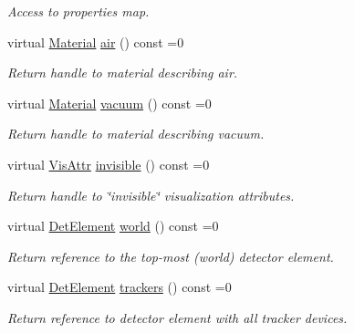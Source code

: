\begin{DoxyCompactItemize}
\begin{DoxyCompactList}\small\item\em Access to properties map. \item\end{DoxyCompactList}\item 
virtual \hyperlink{class_d_d4hep_1_1_geometry_1_1_material}{Material} \hyperlink{class_d_d4hep_1_1_geometry_1_1_l_c_d_d_a35239d8469cba6c091e970a1baec312b}{air} () const =0
\begin{DoxyCompactList}\small\item\em Return handle to material describing air. \item\end{DoxyCompactList}\item 
virtual \hyperlink{class_d_d4hep_1_1_geometry_1_1_material}{Material} \hyperlink{class_d_d4hep_1_1_geometry_1_1_l_c_d_d_adf89eaa970c7c23b6896f79a6ad28b7f}{vacuum} () const =0
\begin{DoxyCompactList}\small\item\em Return handle to material describing vacuum. \item\end{DoxyCompactList}\item 
virtual \hyperlink{class_d_d4hep_1_1_geometry_1_1_vis_attr}{VisAttr} \hyperlink{class_d_d4hep_1_1_geometry_1_1_l_c_d_d_acafee280cadae2b44117eb751e0790aa}{invisible} () const =0
\begin{DoxyCompactList}\small\item\em Return handle to \char`\"{}invisible\char`\"{} visualization attributes. \item\end{DoxyCompactList}\item 
virtual \hyperlink{class_d_d4hep_1_1_geometry_1_1_det_element}{DetElement} \hyperlink{class_d_d4hep_1_1_geometry_1_1_l_c_d_d_ae61d027023791272cf976432c0b3a977}{world} () const =0
\begin{DoxyCompactList}\small\item\em Return reference to the top-\/most (world) detector element. \item\end{DoxyCompactList}\item 
virtual \hyperlink{class_d_d4hep_1_1_geometry_1_1_det_element}{DetElement} \hyperlink{class_d_d4hep_1_1_geometry_1_1_l_c_d_d_a23b3868f3b09adccc62799612285c7db}{trackers} () const =0
\begin{DoxyCompactList}\small\item\em Return reference to detector element with all tracker devices. \item\end{DoxyCompactList}\item 

\end{DoxyCompactItemize}
